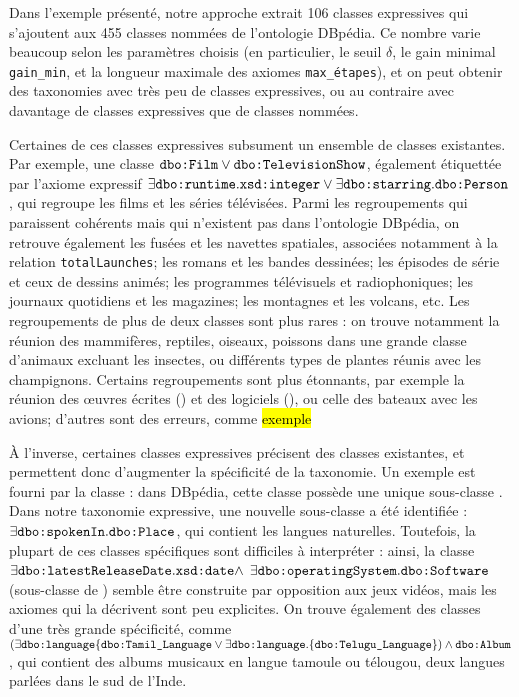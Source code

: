 Dans l'exemple présenté, notre approche extrait 106 classes expressives qui s'ajoutent aux 455 classes nommées de l'ontologie DBpédia.
Ce nombre varie beaucoup selon les paramètres choisis (en particulier, le seuil $\delta$, le gain minimal \texttt{gain\_min}, et la longueur maximale des axiomes \texttt{max\_étapes}), et on peut obtenir des taxonomies avec très peu de classes expressives, ou au contraire avec davantage de classes expressives que de classes nommées.

Certaines de ces classes expressives subsument un ensemble de classes existantes. Par exemple, une classe $\texttt{dbo:Film} \lor \texttt{dbo:TelevisionShow}$, également étiquettée par l'axiome expressif $\exists \texttt{dbo:runtime}.\texttt{xsd:integer} \lor \exists \texttt{dbo:starring}.\texttt{dbo:Person}$, qui regroupe les films et les séries télévisées. Parmi les regroupements qui paraissent cohérents mais qui n'existent pas dans l'ontologie DBpédia, on retrouve également les fusées et les navettes spatiales, associées notamment à la relation \texttt{totalLaunches}; les romans et les bandes dessinées; les épisodes de série et ceux de dessins animés; les programmes télévisuels et radiophoniques; les journaux quotidiens et les magazines; les montagnes et les volcans, etc. Les regroupements de plus de deux classes sont plus rares : on trouve notamment la réunion des mammifères, reptiles, oiseaux, poissons dans une grande classe d'animaux excluant les insectes, ou différents types de plantes réunis avec les champignons. Certains regroupements sont plus étonnants, par exemple la réunion des œuvres écrites () et des logiciels (), ou celle des bateaux avec les avions; d'autres sont des erreurs, comme \hl{exemple}

À l'inverse, certaines classes expressives précisent des classes existantes, et permettent donc d'augmenter la spécificité de la taxonomie. Un exemple est fourni par la classe  : dans DBpédia, cette classe possède une unique sous-classe . Dans notre taxonomie expressive, une nouvelle sous-classe a été identifiée : $\exists \texttt{dbo:spokenIn}.\texttt{dbo:Place}$, qui contient les langues naturelles.
%
Toutefois, la plupart de ces classes spécifiques sont difficiles à interpréter : ainsi, la classe $\exists \texttt{dbo:latestReleaseDate}.\texttt{xsd:date} \land$ $\exists \texttt{dbo:operatingSystem}.\texttt{dbo:Software}$ (sous-classe de ) semble être construite par opposition aux jeux vidéos, mais les axiomes qui la décrivent sont peu explicites.
%
On trouve également des classes d'une très grande spécificité, comme $(\exists \texttt{dbo:language} \{ \texttt{dbo:Tamil\_Language} \lor \exists \texttt{dbo:language}.\{ \texttt{dbo:Telugu\_Language} \}) \land \texttt{dbo:Album}$, qui contient des albums musicaux en langue tamoule ou télougou, deux langues parlées dans le sud de l'Inde. 

